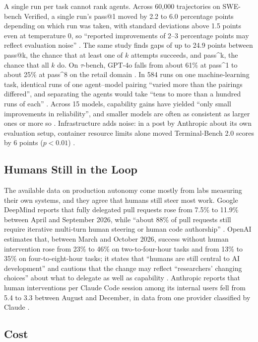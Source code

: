 A single run per task cannot rank agents. Across 60,000 trajectories on SWE-bench Verified, a single run's pass@1 moved by 2.2 to 6.0 percentage points depending on which run was taken, with standard deviations above 1.5 points even at temperature 0, so ``reported improvements of 2--3 percentage points may reflect evaluation noise'' \citep{F19}. The same study finds gaps of up to 24.9 points between pass@k, the chance that at least one of $k$ attempts succeeds, and pass\textasciicircum k, the chance that all $k$ do. On $\tau$-bench, GPT-4o falls from about 61\% at pass\textasciicircum 1 to about 25\% at pass\textasciicircum 8 on the retail domain \citep{A9}. In 584 runs on one machine-learning task, identical runs of one agent--model pairing ``varied more than the pairings differed'', and separating the agents would take ``tens to more than a hundred runs of each'' \citep{F24}. Across 15 models, capability gains have yielded ``only small improvements in reliability'', and smaller models are often as consistent as larger ones or more so \citep{F2}. Infrastructure adds noise: in a post by Anthropic about its own evaluation setup, container resource limits alone moved Terminal-Bench 2.0 scores by 6 points ($p < 0.01$) \citep{F27}.

\subsection{Humans Still in the Loop}

The available data on production autonomy come mostly from labs measuring their own systems, and they agree that humans still steer most work. Google DeepMind reports that fully delegated pull requests rose from 7.5\% to 11.9\% between April and September 2026, while ``about 88\% of pull requests still require iterative multi-turn human steering or human code authorship'' \citep[p.~78]{F30}. OpenAI estimates that, between March and October 2026, success without human intervention rose from 23\% to 46\% on two-to-four-hour tasks and from 13\% to 35\% on four-to-eight-hour tasks; it states that ``humans are still central to AI development'' and cautions that the change may reflect ``researchers' changing choices'' about what to delegate as well as capability \citep{F32}. Anthropic reports that human interventions per Claude Code session among its internal users fell from 5.4 to 3.3 between August and December, in data from one provider classified by Claude \citep{F14}.

\subsection{Cost}


